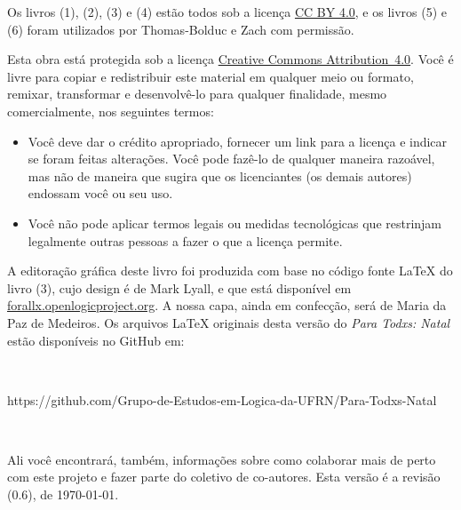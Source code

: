 Os livros (1), (2), (3) e (4) estão todos sob a licença \href{https://creativecommons.org/licenses/by/4.0/}{CC BY 4.0}, e os livros (5) e (6) foram utilizados por Thomas-Bolduc e Zach com permissão.\label{cc4by}




Esta obra está protegida sob a licença \href{https://creativecommons.org/licenses/by/4.0/}{Creative Commons \hbox{Attribution 4.0}}. 
Você é livre para copiar e redistribuir este material em qualquer meio ou formato, remixar, transformar e desenvolvê-lo para qualquer finalidade, mesmo comercialmente, nos seguintes termos:
\begin{itemize}
\item Você deve dar o crédito apropriado, fornecer um link para a licença e indicar se foram feitas alterações. Você pode fazê-lo de qualquer maneira razoável, mas não de maneira que sugira que os licenciantes (os demais autores) endossam você ou seu uso.
\item Você não pode aplicar termos legais ou medidas tecnológicas que restrinjam legalmente outras pessoas a fazer o que a licença permite.
\end{itemize}

\noindent A editoração gráfica deste livro foi produzida com base no código fonte \LaTeX{} do livro (3), cujo design é de Mark Lyall, e que está disponível em \hbox{\href{https://forallx.openlogicproject.org}{forallx.openlogicproject.org}}.
A nossa capa, ainda em confecção, será de Maria da Paz de Medeiros.
Os arquivos  \LaTeX{} originais desta versão do \textit{Para Todxs: Natal} estão disponíveis no GitHub em:

\

\hbox{{\footnotesize https://github.com/Grupo-de-Estudos-em-Logica-da-UFRN/Para-Todxs-Natal}} 

\

\noindent Ali você encontrará, também, informações sobre como colaborar mais de perto com este projeto e fazer parte do coletivo de co-autores.
Esta versão é a revisão (0.6), de \today.



